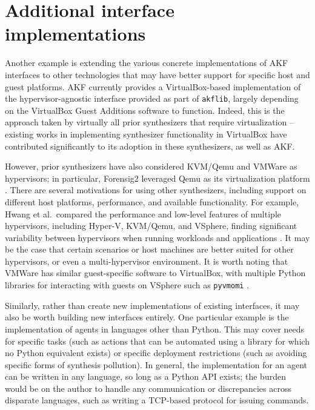 \section{Additional interface
implementations}\label{additional-interface-implementations}

Another example is extending the various concrete implementations of AKF
interfaces to other technologies that may have better support for
specific host and guest platforms. AKF currently provides a
VirtualBox-based implementation of the hypervisor-agnostic interface
provided as part of \passthrough{\lstinline!akflib!}, largely depending
on the VirtualBox Guest Additions software to function. Indeed, this is
the approach taken by virtually all prior synthesizers that require
virtualization -- existing works in implementing synthesizer
functionality in VirtualBox have contributed significantly to its
adoption in these synthesizers, as well as AKF.

However, prior synthesizers have also considered KVM/Qemu and VMWare as
hypervisors; in particular, Forensig2 leveraged Qemu as its
virtualization platform \cite{mochForensicImageGenerator2009}. There
are several motivations for using other synthesizers, including support
on different host platforms, performance, and available functionality.
For example, Hwang et al.~compared the performance and low-level
features of multiple hypervisors, including Hyper-V, KVM/Qemu, and
VSphere, finding significant variability between hypervisors when
running workloads and applications
\cite{hwangComponentbasedPerformanceComparison2013}. It may be the
case that certain scenarios or host machines are better suited for other
hypervisors, or even a multi-hypervisor environment. It is worth noting
that VMWare has similar guest-specific software to VirtualBox, with
multiple Python libraries for interacting with guests on VSphere such as
\passthrough{\lstinline!pyvmomi!} \cite{VmwarePyvmomi2025}.

Similarly, rather than create new implementations of existing
interfaces, it may also be worth building new interfaces entirely. One
particular example is the implementation of agents in languages other
than Python. This may cover needs for specific tasks (such as actions
that can be automated using a library for which no Python equivalent
exists) or specific deployment restrictions (such as avoiding specific
forms of synthesis pollution). In general, the implementation for an
agent can be written in any language, so long as a Python API exists;
the burden would be on the author to handle any communication or
discrepancies across disparate languages, such as writing a TCP-based
protocol for issuing commands.

